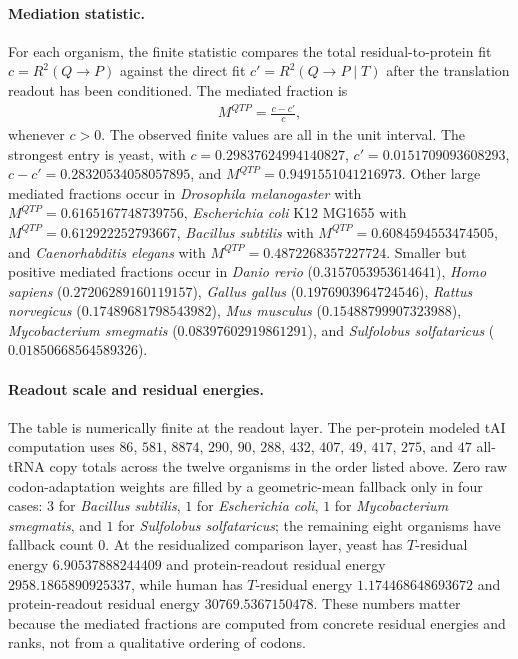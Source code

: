 \paragraph{Mediation statistic.}
For each organism, the finite statistic compares the total residual-to-protein fit $c=R^2(Q\to P)$ against the direct fit $c'=R^2(Q\to P\mid T)$ after the translation readout has been conditioned. The mediated fraction is
$$
\begin{aligned}
M^{QTP}=\frac{c-c'}{c},
\end{aligned}
$$
whenever $c>0$. The observed finite values are all in the unit interval. The strongest entry is yeast, with $c=0.29837624994140827$, $c'=0.0151709093608293$, $c-c'=0.28320534058057895$, and $M^{QTP}=0.9491551041216973$. Other large mediated fractions occur in \emph{Drosophila melanogaster} with $M^{QTP}=0.6165167748739756$, \emph{Escherichia coli} K12 MG1655 with $M^{QTP}=0.612922252793667$, \emph{Bacillus subtilis} with $M^{QTP}=0.6084594553474505$, and \emph{Caenorhabditis elegans} with $M^{QTP}=0.4872268357227724$. Smaller but positive mediated fractions occur in \emph{Danio rerio} ($0.3157053953614641$), \emph{Homo sapiens} ($0.27206289160119157$), \emph{Gallus gallus} ($0.1976903964724546$), \emph{Rattus norvegicus} ($0.17489681798543982$), \emph{Mus musculus} ($0.15488799907323988$), \emph{Mycobacterium smegmatis} ($0.08397602919861291$), and \emph{Sulfolobus solfataricus} ($0.01850668564589326$).

\paragraph{Readout scale and residual energies.}
The table is numerically finite at the readout layer. The per-protein modeled tAI computation uses $86$, $581$, $8874$, $290$, $90$, $288$, $432$, $407$, $49$, $417$, $275$, and $47$ all-tRNA copy totals across the twelve organisms in the order listed above. Zero raw codon-adaptation weights are filled by a geometric-mean fallback only in four cases: $3$ for \emph{Bacillus subtilis}, $1$ for \emph{Escherichia coli}, $1$ for \emph{Mycobacterium smegmatis}, and $1$ for \emph{Sulfolobus solfataricus}; the remaining eight organisms have fallback count $0$. At the residualized comparison layer, yeast has $T$-residual energy $6.90537888244409$ and protein-readout residual energy $2958.1865890925337$, while human has $T$-residual energy $1.174468648693672$ and protein-readout residual energy $30769.5367150478$. These numbers matter because the mediated fractions are computed from concrete residual energies and ranks, not from a qualitative ordering of codons.

